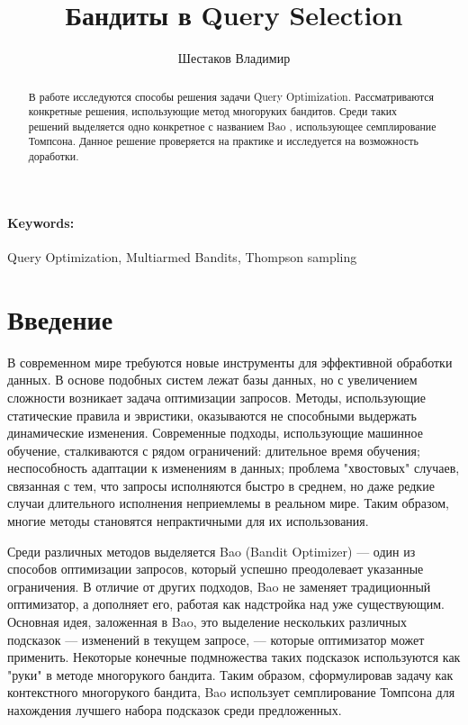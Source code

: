 \documentclass[12pt]{article}
\title{Бандиты в Query Selection}
\author{Шестаков Владимир}
\date{}
\begin{document}
\maketitle

\begin{abstract}
В работе исследуются способы решения задачи Query Optimization. Рассматриваются конкретные решения, использующие метод многоруких бандитов. Среди таких решений выделяется одно конкретное с названием Bao \cite{bao}, использующее семплирование Томпсона. Данное решение проверяется на практике и исследуется на возможность доработки.
\end{abstract}
\paragraph{Keywords:} Query Optimization, Multiarmed Bandits, Thompson sampling

\section{Введение}
В современном мире требуются новые инструменты для эффективной обработки данных. В основе подобных систем лежат базы данных, но с увеличением сложности возникает задача оптимизации запросов. Методы, использующие статические правила и эвристики, оказываются не способными выдержать динамические изменения. Современные подходы, использующие машинное обучение, сталкиваются с рядом ограничений: длительное время обучения; неспособность адаптации к изменениям в данных; проблема "хвостовых" случаев, связанная с тем, что запросы исполняются быстро в среднем, но даже редкие случаи длительного исполнения неприемлемы в реальном мире. Таким образом, многие методы становятся непрактичными для их использования.

Среди различных методов выделяется Bao (Bandit Optimizer) \cite{bao} — один из способов оптимизации запросов, который успешно преодолевает указанные ограничения. В отличие от других подходов, Bao не заменяет традиционный оптимизатор, а дополняет его, работая как надстройка над уже существующим. Основная идея, заложенная в Bao, это выделение нескольких различных подсказок — изменений в текущем запросе, — которые оптимизатор может применить. Некоторые конечные подмножества таких подсказок используются как "руки" в методе многорукого бандита. Таким образом, сформулировав задачу как контекстного многорукого бандита, Bao использует семплирование Томпсона для нахождения лучшего набора подсказок среди предложенных.
\end{document}
